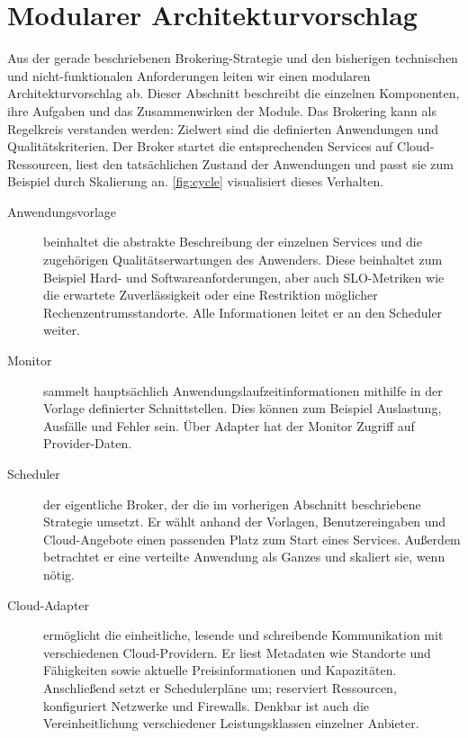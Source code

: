 \section{Modularer Architekturvorschlag}
\label{sec:architektur}

Aus der gerade beschriebenen Brokering-Strategie und den bisherigen technischen und nicht-funktionalen Anforderungen leiten wir einen modularen Architekturvorschlag ab. Dieser Abschnitt beschreibt die einzelnen Komponenten, ihre Aufgaben und das Zusammenwirken der Module. Das Brokering kann als Regelkreis verstanden werden: Zielwert sind die definierten Anwendungen und Qualitätskriterien. Der Broker startet die entsprechenden Services auf Cloud-Ressourcen, liest den tatsächlichen Zustand der Anwendungen und passt sie zum Beispiel durch Skalierung an. \autoref{fig:cycle} visualisiert dieses Verhalten.

\begin{description}
	
	\item[Anwendungsvorlage] beinhaltet die abstrakte Beschreibung der einzelnen Services und die zugehörigen Qualitätserwartungen des Anwenders. Diese beinhaltet zum Beispiel Hard- und Softwareanforderungen, aber auch SLO-Metriken wie die erwartete Zuverlässigkeit oder eine Restriktion möglicher Rechenzentrumsstandorte. Alle Informationen leitet er an den Scheduler weiter.	
	
	\item[Monitor] sammelt hauptsächlich Anwendungslaufzeitinformationen mithilfe in der Vorlage definierter Schnittstellen. Dies können zum Beispiel Auslastung, Ausfälle und Fehler sein. Über Adapter hat der Monitor Zugriff auf Provider-Daten.	
	
	\item[Scheduler] der eigentliche Broker, der die im vorherigen Abschnitt beschriebene Strategie umsetzt. Er wählt anhand der Vorlagen, Benutzereingaben und Cloud-Angebote einen passenden Platz zum Start eines Services. Außerdem betrachtet er eine verteilte Anwendung als Ganzes und skaliert sie, wenn nötig.	
	
	\item[Cloud-Adapter] ermöglicht die einheitliche, lesende und schreibende Kommunikation mit verschiedenen Cloud-Providern. Er liest Metadaten wie Standorte und Fähigkeiten sowie aktuelle Preisinformationen und Kapazitäten. Anschließend setzt er Schedulerpläne um; reserviert Ressourcen, konfiguriert Netzwerke und Firewalls. Denkbar ist auch die Vereinheitlichung verschiedener Leistungsklassen einzelner Anbieter.
	
\end{description}

